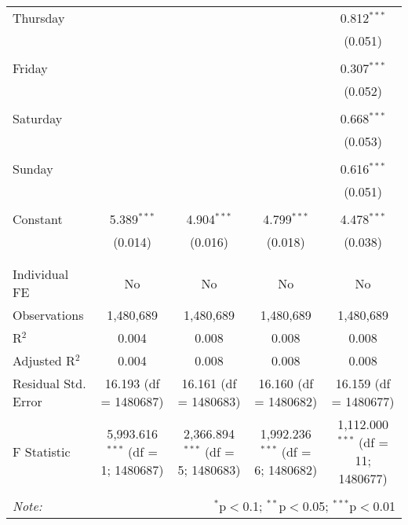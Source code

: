 \documentclass[
]{article}
\begin{document}
\begin{table}[!htbp]
{\begin{tabular}{@{\extracolsep{5pt}}lcccc}
 Thursday &  &  &  & 0.812$^{***}$ \\ 
  &  &  &  & (0.051) \\ 
  & & & & \\ 
 Friday &  &  &  & 0.307$^{***}$ \\ 
  &  &  &  & (0.052) \\ 
  & & & & \\ 
 Saturday &  &  &  & 0.668$^{***}$ \\ 
  &  &  &  & (0.053) \\ 
  & & & & \\ 
 Sunday &  &  &  & 0.616$^{***}$ \\ 
  &  &  &  & (0.051) \\ 
  & & & & \\ 
 Constant & 5.389$^{***}$ & 4.904$^{***}$ & 4.799$^{***}$ & 4.478$^{***}$ \\ 
  & (0.014) & (0.016) & (0.018) & (0.038) \\ 
  & & & & \\ 
\hline \\[-1.8ex] 
Individual FE & No & No & No & No \\ 
Observations & 1,480,689 & 1,480,689 & 1,480,689 & 1,480,689 \\ 
R$^{2}$ & 0.004 & 0.008 & 0.008 & 0.008 \\ 
Adjusted R$^{2}$ & 0.004 & 0.008 & 0.008 & 0.008 \\ 
Residual Std. Error & 16.193 (df = 1480687) & 16.161 (df = 1480683) & 16.160 (df = 1480682) & 16.159 (df = 1480677) \\ 
F Statistic & 5,993.616$^{***}$ (df = 1; 1480687) & 2,366.894$^{***}$ (df = 5; 1480683) & 1,992.236$^{***}$ (df = 6; 1480682) & 1,112.000$^{***}$ (df = 11; 1480677) \\ 
\hline 
\hline \\[-1.8ex] 
\textit{Note:}  & \multicolumn{4}{r}{$^{*}$p$<$0.1; $^{**}$p$<$0.05; $^{***}$p$<$0.01} \\ 
\end{tabular}
} 
\end{table} 
\newpage
\end{document}
